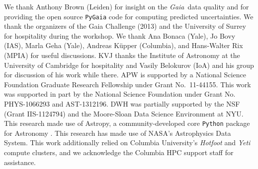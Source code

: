 \documentclass[letterpaper,12pt,preprint]{aastex}
\newcommand{\project}[1]{\textsl{#1}}
\newcommand{\gaia}{\project{Gaia}}
\begin{document}
\acknowledgements
We thank Anthony Brown (Leiden) for insight on the \gaia\, data quality and for providing the open source \texttt{PyGaia} code for computing predicted uncertainties. We thank the organizers of the Gaia Challenge (2013) and the University of Surrey for hospitality during the workshop. We thank Ana Bonaca (Yale), Jo Bovy (IAS), Marla Geha (Yale), Andreas K{\"u}pper (Columbia), and Hans-Walter Rix (MPIA) for useful discussions.
KVJ thanks the Institute of Astronomy at the University of Cambridge for hospitality and Vasily Belokurov (IoA) and his group for discussion of his work while there.
APW is supported by a National Science Foundation Graduate Research Fellowship under Grant No.\ 11-44155. This work was supported in part by the National Science Foundation under Grant No. PHYS-1066293 and AST-1312196. 
DWH was partially supported by the NSF (Grant IIS-1124794) and the Moore-Sloan Data Science Environment at NYU.
This research made use of Astropy, a community-developed core \texttt{Python} package for Astronomy \citep{astropy13}. This research has made use of NASA's Astrophysics Data System.
This work additionally relied on Columbia University's \emph{Hotfoot} and \emph{Yeti} compute clusters, and we acknowledge the Columbia HPC support staff for assistance. \\



\end{document}
